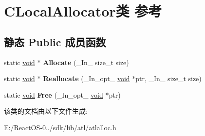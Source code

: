 \hypertarget{class_c_local_allocator}{}\section{C\+Local\+Allocator类 参考}
\label{class_c_local_allocator}
\subsection*{静态 Public 成员函数}
\begin{DoxyCompactItemize}
\item 
\mbox{\label{class_c_local_allocator_aa437e961cef8c1e6ad57c3b834ca997e}} 
static \hyperlink{interfacevoid}{void} $\ast$ {\bfseries Allocate} (\+\_\+\+In\+\_\+ size\+\_\+t size)
\item 
\mbox{\label{class_c_local_allocator_a1e12f7432bbdc75604ab2eac193172cd}} 
static \hyperlink{interfacevoid}{void} $\ast$ {\bfseries Reallocate} (\+\_\+\+In\+\_\+opt\+\_\+ \hyperlink{interfacevoid}{void} $\ast$ptr, \+\_\+\+In\+\_\+ size\+\_\+t size)
\item 
\mbox{\label{class_c_local_allocator_a0297e6c58ea14839cd551c521baa2e7b}} 
static \hyperlink{interfacevoid}{void} {\bfseries Free} (\+\_\+\+In\+\_\+opt\+\_\+ \hyperlink{interfacevoid}{void} $\ast$ptr)
\end{DoxyCompactItemize}


该类的文档由以下文件生成\+:\begin{DoxyCompactItemize}
\item 
E\+:/\+React\+O\+S-\/0../sdk/lib/atl/atlalloc.\+h\end{DoxyCompactItemize}
